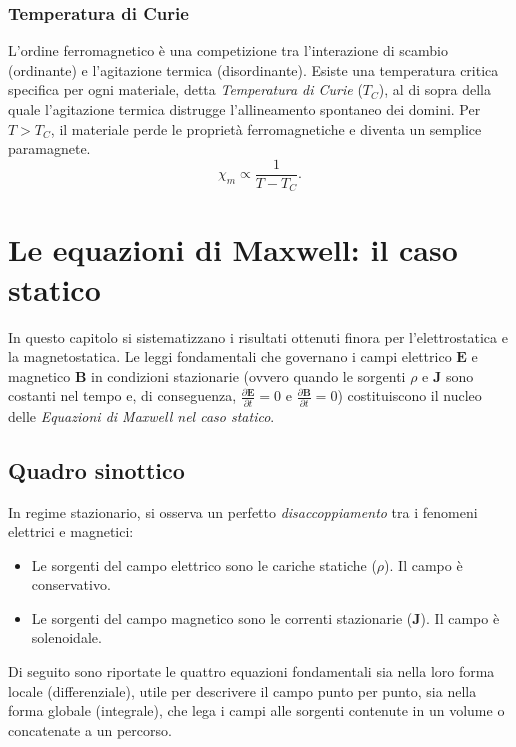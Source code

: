 \documentclass[a4paper,11pt]{report}
\begin{document}
\subsection{Temperatura di Curie}
L'ordine ferromagnetico è una competizione tra l'interazione di scambio (ordinante) e l'agitazione termica (disordinante). Esiste una temperatura critica specifica per ogni materiale, detta \textit{Temperatura di Curie} ($T_C$), al di sopra della quale l'agitazione termica distrugge l'allineamento spontaneo dei domini.
Per $T > T_C$, il materiale perde le proprietà ferromagnetiche e diventa un semplice paramagnete.
\begin{equation}
    \chi_m \propto \frac{1}{T - T_C}.
\end{equation}


\chapter{Le equazioni di Maxwell: il caso statico}

In questo capitolo si sistematizzano i risultati ottenuti finora per l'elettrostatica e la magnetostatica.
Le leggi fondamentali che governano i campi elettrico $\bm{E}$ e magnetico $\bm{B}$ in condizioni stazionarie (ovvero quando le sorgenti $\rho$ e $\bm{J}$ sono costanti nel tempo e, di conseguenza, $\frac{\partial \bm{E}}{\partial t} = 0$ e $\frac{\partial \bm{B}}{\partial t} = 0$) costituiscono il nucleo delle \textit{Equazioni di Maxwell nel caso statico}.

\section{Quadro sinottico}

In regime stazionario, si osserva un perfetto \textit{disaccoppiamento} tra i fenomeni elettrici e magnetici:
\begin{itemize}
    \item Le sorgenti del campo elettrico sono le cariche statiche ($\rho$). Il campo è conservativo.
    \item Le sorgenti del campo magnetico sono le correnti stazionarie ($\bm{J}$). Il campo è solenoidale.
\end{itemize}
Di seguito sono riportate le quattro equazioni fondamentali sia nella loro forma locale (differenziale), utile per descrivere il campo punto per punto, sia nella forma globale (integrale), che lega i campi alle sorgenti contenute in un volume o concatenate a un percorso.
\end{document}
